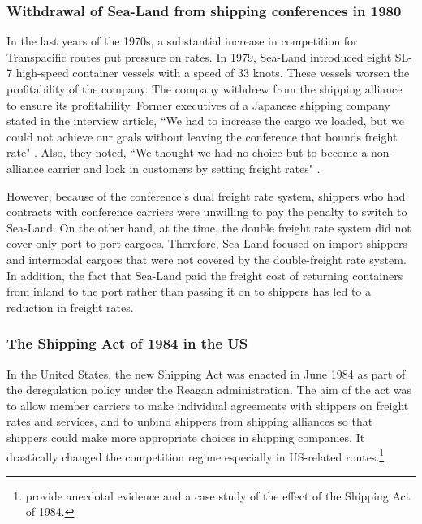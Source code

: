 \documentclass[11pt]{article}
\begin{document}
\subsubsection{Withdrawal of Sea-Land from shipping conferences in 1980}\label{subsec:withdrawal_of_sea-land_from_cartel_in_1980}
In the last years of the 1970s, a substantial increase in competition for Transpacific routes put pressure on rates. In 1979, Sea-Land introduced eight SL-7 high-speed container vessels with a speed of 33 knots. These vessels worsen the profitability of the company. The company withdrew from the shipping alliance to ensure its profitability. Former executives of a Japanese shipping company stated in the interview article, ``We had to increase the cargo we loaded, but we could not achieve our goals without leaving the conference that bounds freight rate" \citep{JapanMaritimeDaily2006}. Also, they noted, ``We thought we had no choice but to become a non-alliance carrier and lock in customers by setting freight rates" \citep{JapanMaritimeDaily2006}.

However, because of the conference's dual freight rate system, shippers who had contracts with conference carriers were unwilling to pay the penalty to switch to Sea-Land. On the other hand, at the time, the double freight rate system did not cover only port-to-port cargoes. Therefore, Sea-Land focused on import shippers and intermodal cargoes that were not covered by the double-freight rate system. In addition, the fact that Sea-Land paid the freight cost of returning containers from inland to the port rather than passing it on to shippers has led to a reduction in freight rates.

\subsubsection{The Shipping Act of 1984 in the US}\label{subsec:shipping_act_of_1984}

In the United States, the new Shipping Act was enacted in June 1984 as part of the deregulation policy under the Reagan administration. The aim of the act was to allow member carriers to make individual agreements with shippers on freight rates and services, and to unbind shippers from shipping alliances so that shippers could make more appropriate choices in shipping companies. It drastically changed the competition regime especially in US-related routes.\footnote{\cite{wilson1991some} provide anecdotal evidence and a case study of the effect of the Shipping Act of 1984.}  
\end{document}
